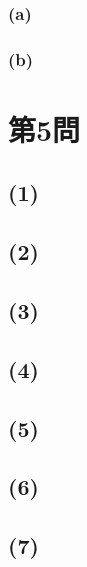 \documentclass[a4paper,12pt,xelatex,ja=standard]{bxjsarticle}
\begin{document}
    \subsubsection*{(a)}
    \subsubsection*{(b)}

\section*{第5問\ }
  \subsection*{(1)}
  \subsection*{(2)}
  \subsection*{(3)}
  \subsection*{(4)}
  \subsection*{(5)}
  \subsection*{(6)}
  \subsection*{(7)}
\end{document}
